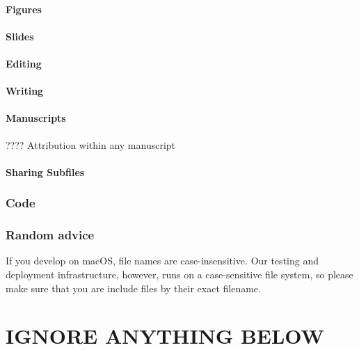 \hypertarget{figures}{%
\paragraph{Figures}\label{figures}}

\hypertarget{slides}{%
\paragraph{Slides}\label{slides}}

\hypertarget{editing}{%
\paragraph{Editing}\label{editing}}

\hypertarget{writing}{%
\paragraph{Writing}\label{writing}}

\hypertarget{manuscripts}{%
\paragraph{Manuscripts}\label{manuscripts}}

???? Attribution within any manuscript

\hypertarget{sharing-subfiles}{%
\paragraph{Sharing Subfiles}\label{sharing-subfiles}}

\hypertarget{code}{%
\subsubsection{Code}\label{code}}

\hypertarget{random-advice}{%
\subsubsection{Random advice}\label{random-advice}}

If you develop on macOS, file names are case-insensitive. Our testing
and deployment infrastructure, however, runs on a case-sensitive file
system, so please make sure that you are include files by their exact
filename.

\hypertarget{ignore-anything-below}{%
\section{IGNORE ANYTHING BELOW}\label{ignore-anything-below}}

